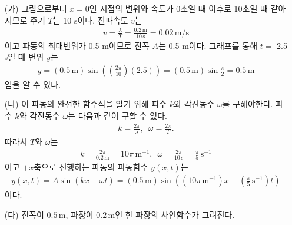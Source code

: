 \documentclass[floatfix,nofootinbib,superscriptaddress,fleqn]{revtex4-2}
\begin{document}
\vspace{0.5cm} 
\begin{itemize}
  \item[(가)]
  그림으로부터 $ x=0$인 지점의 변위와 속도가 0초일 때 이후로 10초일 때 같아지므로 주기 $T$는 10 s이다.
  전파속도 $v$는 
  \begin{align}
    v = \frac{\lambda}{T} = \frac{0.2\,\mathrm{m}}{10\,\mathrm{s}}=0.02\,\mathrm{m/s}
  \end{align}
  이고 파동의 최대변위가 0.5 m이므로 진폭 $A$는 0.5 m이다. 그래프를 통해 
  $t=$ 2.5 s일 때 변위 $y$는
  \begin{align}
    y = (0.5\,\mathrm{m})\sin\left(\left(\frac{2\pi}{10}\right)(2.5)\right)
    =(0.5\,\mathrm{m})\sin\frac{\pi}{2} = 0.5\,\mathrm{m}
  \end{align}
  임을 알 수 있다.
  \item[(나)]
  이 파동의 완전한 함수식을 알기 위해 파수 $k$와 각진동수 $\omega$를 구해야한다. 
  파수 $k$와 각진동수 $\omega$는 다음과 같이 구할 수 있다.
  \begin{align}
    k = \frac{2\pi}{\lambda},\,\,\, \omega = \frac{2\pi}{T}.
  \end{align}
  따라서 $T$와 $\omega$는
  \begin{align}
    k = \frac{2\pi}{0.2\,\mathrm{m}}=10\pi\,\mathrm{m^{-1}},\,\,\,
    \omega = \frac{2\pi}{10\,\mathrm{s}} = \frac{\pi}{5}\,\mathrm{s^{-1}}
  \end{align}
  이고 $+x$축으로 진행하는 파동의 파동함수 $y(x,t)$는
  \begin{align}
    y(x,t) = A\sin(kx-\omega t)
    = (0.5\,\mathrm{m})\sin\left((10\pi\,\mathrm{m^{-1}})x
    -\left(\frac{\pi}{5}\,\mathrm{s^{-1}}\right) t\right)
  \end{align}
  이다.
  \item[(다)]
  진폭이 $0.5\,\mathrm{m}$, 파장이 $0.2\,\mathrm{m}$인 한 파장의 사인함수가 그려진다.
\end{itemize}
\vspace{0.5cm}
 
\end{document}
